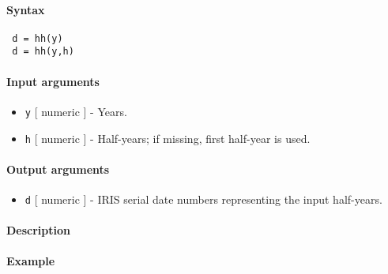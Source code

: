 


	\paragraph{Syntax}
 
 \begin{verbatim}
 d = hh(y)
 d = hh(y,h)
 \end{verbatim}
 
 \paragraph{Input arguments}
 
 \begin{itemize}
 \item
   \texttt{y} {[} numeric {]} - Years.
 \item
   \texttt{h} {[} numeric {]} - Half-years; if missing, first half-year
   is used.
 \end{itemize}
 
 \paragraph{Output arguments}
 
 \begin{itemize}
 \item
   \texttt{d} {[} numeric {]} - IRIS serial date numbers representing the
   input half-years.
 \end{itemize}
 
 \paragraph{Description}
 
 \paragraph{Example}


